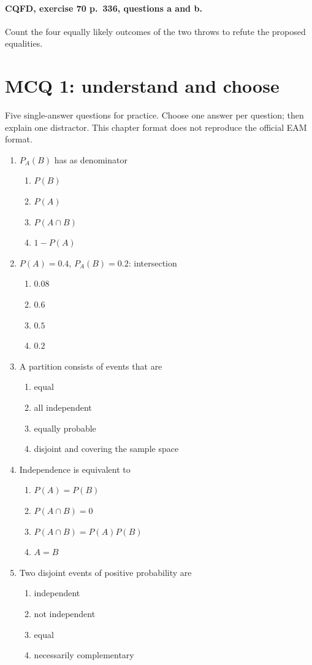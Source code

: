 \paragraph{CQFD, exercise 70 p.~336, questions a and b.}\label{C05-M2} Count the four equally likely outcomes of the two throws to refute the proposed equalities.
\begingroup\small
\clearpage\section*{MCQ 1: understand and choose}\label{C05-Q1}
Five single-answer questions for practice. Choose one answer per question; then explain one distractor. This chapter format does not reproduce the official EAM format.
\begin{enumerate}
\item $P_A(B)$ has as denominator
\begin{enumerate}[label=\Alph*.,itemsep=2pt]
\item $P(B)$
\item $P(A)$
\item $P(A\cap B)$
\item $1-P(A)$
\end{enumerate}
\item $P(A)=0.4$, $P_A(B)=0.2$: intersection
\begin{enumerate}[label=\Alph*.,itemsep=2pt]
\item $0.08$
\item $0.6$
\item $0.5$
\item $0.2$
\end{enumerate}
\item A partition consists of events that are
\begin{enumerate}[label=\Alph*.,itemsep=2pt]
\item equal
\item all independent
\item equally probable
\item disjoint and covering the sample space
\end{enumerate}
\item Independence is equivalent to
\begin{enumerate}[label=\Alph*.,itemsep=2pt]
\item $P(A)=P(B)$
\item $P(A\cap B)=0$
\item $P(A\cap B)=P(A)P(B)$
\item $A=B$
\end{enumerate}
\item Two disjoint events of positive probability are
\begin{enumerate}[label=\Alph*.,itemsep=2pt]
\item independent
\item not independent
\item equal
\item necessarily complementary
\end{enumerate}
\end{enumerate}
